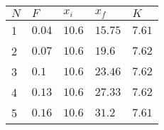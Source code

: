 \begin{center}
	\begin{tabular}{C{0.5cm}C{1cm}C{1cm}C{1cm}C{1cm}}
		$N$ & $F$    & $x_i$  & $x_f$   & $K$    \\
		   & $0.04$ & $10.6$ & $15.75$ & $7.61$ \\
		2   & $0.07$ & $10.6$ & $19.6$  & $7.62$ \\
		3   & $0.1$  & $10.6$ & $23.46$ & $7.62$ \\
		4   & $0.13$ & $10.6$ & $27.33$ & $7.62$ \\
		5   & $0.16$ & $10.6$ & $31.2$  & $7.61$
	\end{tabular}
\end{center}
